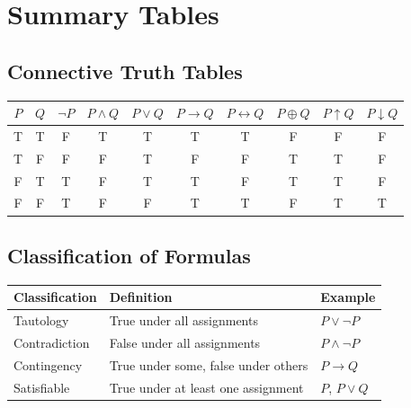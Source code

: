 
\section{Summary Tables}

\subsection{Connective Truth Tables}

\begin{center}
\renewcommand{\arraystretch}{1.2}
\begin{tabular}{|c|c||c|c|c|c|c|c|c|c|}
\hline
$P$ & $Q$ & $\neg P$ & $P \wedge Q$ & $P \vee Q$ & $P \rightarrow Q$ & $P \leftrightarrow Q$ & $P \oplus Q$ & $P \uparrow Q$ & $P \downarrow Q$ \\
\hline
T & T & F & T & T & T & T & F & F & F \\
T & F & F & F & T & F & F & T & T & F \\
F & T & T & F & T & T & F & T & T & F \\
F & F & T & F & F & T & T & F & T & T \\
\hline
\end{tabular}
\end{center}

\subsection{Classification of Formulas}

\begin{center}
\renewcommand{\arraystretch}{1.3}
\begin{tabular}{|l|l|l|}
\hline
\textbf{Classification} & \textbf{Definition} & \textbf{Example} \\
\hline
Tautology & True under all assignments & $P \vee \neg P$ \\
Contradiction & False under all assignments & $P \wedge \neg P$ \\
Contingency & True under some, false under others & $P \rightarrow Q$ \\
Satisfiable & True under at least one assignment & $P$, $P \vee Q$ \\
\hline
\end{tabular}
\end{center}

